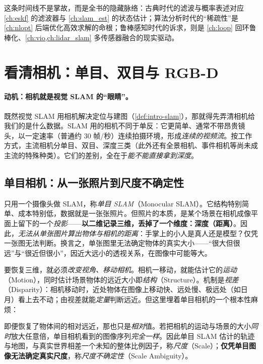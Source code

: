 \noindent 这条时间线不是掌故，而是全书的隐藏脉络：古典时代的滤波与概率表述对应 \cref{ch:eskf} 的滤波器与 \cref{ch:slam_est} 的状态估计；算法分析时代的“稀疏性”是 \cref{ch:nlopt} 后端优化高效求解的命根；鲁棒感知时代的诉求，则是 \cref{ch:loop} 回环鲁棒化、\cref{ch:vio,ch:lidar_slam} 多传感器融合的现实驱动。

\section{看清相机：单目、双目与 RGB-D}
\label{sec:intro-camera}

\paragraph{动机：相机就是视觉 SLAM 的“眼睛”。}
既然视觉 SLAM 用相机解决定位与建图（\cref{def:intro-slam}），那就得先弄清相机给我们的是什么数据。SLAM 用的相机不同于单反：它更简单、通常不带昂贵镜头，以一定速率（普通约 $30$ 帧/秒）连续拍摄环境，形成\emph{连续的视频流}\cite{gaoxiang2019slam14}。按工作方式，主流相机分单目、双目、深度三类（此外还有全景相机、事件相机等尚未成主流的特殊种类）。它们的差别，全在于\emph{能不能直接拿到深度}。

\subsection{单目相机：从一张照片到尺度不确定性}
\label{sec:intro-mono}
只用一个摄像头做 SLAM，称\emph{单目 SLAM}（Monocular SLAM）。它结构特别简单、成本特别低，数据就是一张张照片。但照片的本质，是某个场景在相机成像平面上留下的一个\emph{投影}——\textbf{以二维记录三维，丢掉了一个维度：深度（距离）}\cite{gaoxiang2019slam14}。因此，\emph{无法从单张图片算出物体与相机的距离}：手掌上的小人是真人还是模型？仅凭一张图无法判断。换言之，单张图里无法确定物体的真实大小——“很大但很远”与“很近但很小”，因近大远小的透视关系，在图像中可能等大。

要恢复三维，就必须\emph{改变视角、移动相机}。相机一移动，就能估计它的\emph{运动}（Motion），同时估计场景物体的远近大小即\emph{结构}（Structure）。机制是\emph{视差}（Disparity）：相机移动时，近处物体在图像上移动快、远处慢、极远处（如日月）看上去不动；由视差就能\emph{定量}判断远近。但这里埋着单目相机的一个根本性麻烦：

\begin{theorem}[单目的尺度不确定性]\label{thm:intro-scale}
即便恢复了物体间的相对远近，那也只是\emph{相对}值。若把相机的运动与场景的大小\emph{同时}放大任意倍，单目相机看到的图像序列\emph{完全一样}。因此单目 SLAM 估计的轨迹与地图，与真实世界相差一个未知的整体比例因子，称\emph{尺度}（Scale）；\textbf{仅凭单目图像无法确定真实尺度}，称\emph{尺度不确定性}（Scale Ambiguity）\cite{gaoxiang2019slam14}。
\end{theorem}

